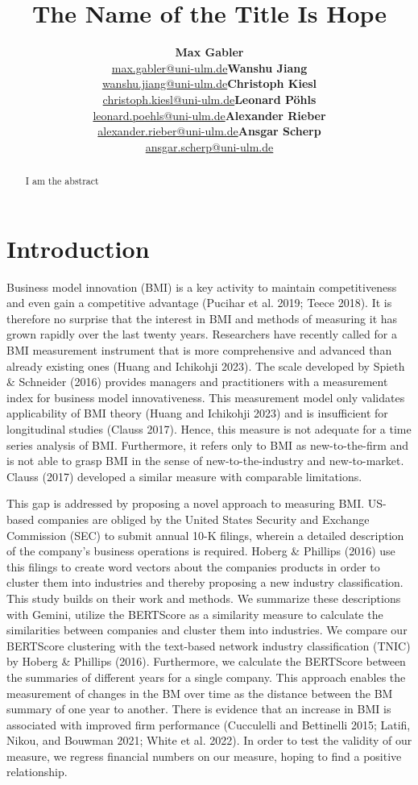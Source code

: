 \documentclass[
]{article}
\title{The Name of the Title Is Hope}
\author{\textbf{Max
Gabler}\\\href{mailto:max.gabler@uni-ulm.de}{max.gabler@uni-ulm.de}\asep\textbf{Wanshu
Jiang}\\\href{mailto:wanshu.jiang@uni-ulm.de}{wanshu.jiang@uni-ulm.de}\asep\textbf{Christoph
Kiesl}\\\href{mailto:christoph.kiesl@uni-ulm.de}{christoph.kiesl@uni-ulm.de}\asep\textbf{Leonard
Pöhls}\\\href{mailto:leonard.poehls@uni-ulm.de}{leonard.poehls@uni-ulm.de}\asep\textbf{Alexander
Rieber}\\\href{mailto:alexander.rieber@uni-ulm.de}{alexander.rieber@uni-ulm.de}\asep\textbf{Ansgar
Scherp}\\\href{mailto:ansgar.scherp@uni-ulm.de}{ansgar.scherp@uni-ulm.de}}
\date{}
\renewcommand*\contentsname{Table of contents}
\newcommand\contentsname{Table of contents}
\begin{document}
\maketitle
\begin{abstract}
I am the abstract
\end{abstract}

\renewcommand*\contentsname{Table of contents}
{
\hypersetup{linkcolor=}
\setcounter{tocdepth}{3}
\tableofcontents
}
\section{Introduction}\label{introduction}

Business model innovation (BMI) is a key activity to maintain
competitiveness and even gain a competitive advantage (Pucihar et al.
2019; Teece 2018). It is therefore no surprise that the interest in BMI
and methods of measuring it has grown rapidly over the last twenty
years. Researchers have recently called for a BMI measurement instrument
that is more comprehensive and advanced than already existing ones
(Huang and Ichikohji 2023). The scale developed by Spieth \& Schneider
(2016) provides managers and practitioners with a measurement index for
business model innovativeness. This measurement model only validates
applicability of BMI theory (Huang and Ichikohji 2023) and is
insufficient for longitudinal studies (Clauss 2017). Hence, this measure
is not adequate for a time series analysis of BMI. Furthermore, it
refers only to BMI as new-to-the-firm and is not able to grasp BMI in
the sense of new-to-the-industry and new-to-market. Clauss (2017)
developed a similar measure with comparable limitations.

This gap is addressed by proposing a novel approach to measuring BMI.
US-based companies are obliged by the United States Security and
Exchange Commission (SEC) to submit annual 10-K filings, wherein a
detailed description of the company's business operations is required.
Hoberg \& Phillips (2016) use this filings to create word vectors about
the companies products in order to cluster them into industries and
thereby proposing a new industry classification. This study builds on
their work and methods. We summarize these descriptions with Gemini,
utilize the BERTScore as a similarity measure to calculate the
similarities between companies and cluster them into industries. We
compare our BERTScore clustering with the text-based network industry
classification (TNIC) by Hoberg \& Phillips (2016). Furthermore, we
calculate the BERTScore between the summaries of different years for a
single company. This approach enables the measurement of changes in the
BM over time as the distance between the BM summary of one year to
another. There is evidence that an increase in BMI is associated with
improved firm performance (Cucculelli and Bettinelli 2015; Latifi,
Nikou, and Bouwman 2021; White et al. 2022). In order to test the
validity of our measure, we regress financial numbers on our measure,
hoping to find a positive relationship.
\end{document}
